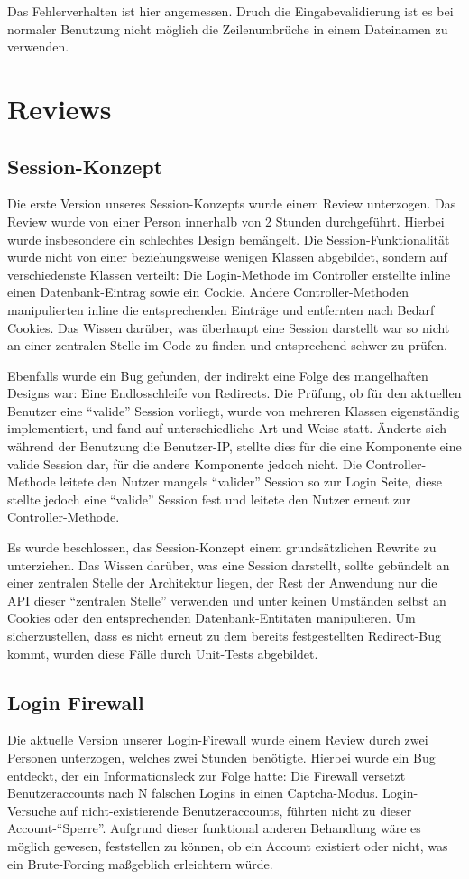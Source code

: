 \documentclass[12pt,DIV14,BCOR10mm,a4paper,parskip=half-,headsepline,headinclude,english,ngerman,bibliography=totocnumbered]{scrreprt}
\begin{document}
Das Fehlerverhalten ist hier angemessen. Druch die Eingabevalidierung ist es bei normaler Benutzung nicht möglich die Zeilenumbrüche in einem Dateinamen zu verwenden.

\section{Reviews}
\subsection{Session-Konzept}
Die erste Version unseres Session-Konzepts wurde einem Review unterzogen. Das Review wurde von einer Person innerhalb von 2 Stunden durchgeführt. Hierbei wurde insbesondere ein schlechtes Design bemängelt. Die Session-Funktionalität wurde nicht von einer beziehungsweise wenigen Klassen abgebildet, sondern auf verschiedenste Klassen verteilt: Die Login-Methode im Controller erstellte inline einen Datenbank-Eintrag sowie ein Cookie. Andere Controller-Methoden manipulierten inline die entsprechenden Einträge und entfernten nach Bedarf Cookies. Das Wissen darüber, was überhaupt eine Session darstellt war so nicht an einer zentralen Stelle im Code zu finden und entsprechend schwer zu prüfen.

Ebenfalls wurde ein Bug gefunden, der indirekt eine Folge des mangelhaften Designs war: Eine Endlosschleife von Redirects. Die Prüfung, ob für den aktuellen Benutzer eine \enquote{valide} Session vorliegt, wurde von mehreren Klassen eigenständig implementiert, und fand auf unterschiedliche Art und Weise statt. Änderte sich während der Benutzung die Benutzer-IP, stellte dies für die eine Komponente eine valide Session dar, für die andere Komponente jedoch nicht. Die Controller-Methode leitete den Nutzer mangels \enquote{valider} Session so zur Login Seite, diese stellte jedoch eine \enquote{valide} Session fest und leitete den Nutzer erneut zur Controller-Methode.

Es wurde beschlossen, das Session-Konzept einem grundsätzlichen Rewrite zu unterziehen. Das Wissen darüber, was eine Session darstellt, sollte gebündelt an einer zentralen Stelle der Architektur liegen, der Rest der Anwendung nur die API dieser \enquote{zentralen Stelle} verwenden und unter keinen Umständen selbst an Cookies oder den entsprechenden Datenbank-Entitäten manipulieren. Um sicherzustellen, dass es nicht erneut zu dem bereits festgestellten Redirect-Bug kommt, wurden diese Fälle durch Unit-Tests abgebildet.

\subsection{Login Firewall}
Die aktuelle Version unserer Login-Firewall wurde einem Review durch zwei Personen unterzogen, welches zwei Stunden benötigte. Hierbei wurde ein Bug entdeckt, der ein Informationsleck zur Folge hatte: Die Firewall versetzt Benutzeraccounts nach N falschen Logins in einen Captcha-Modus. Login-Versuche auf nicht-existierende Benutzeraccounts, führten nicht zu dieser Account-\enquote{Sperre}. Aufgrund dieser funktional anderen Behandlung wäre es möglich gewesen, feststellen zu können, ob ein Account existiert oder nicht, was ein Brute-Forcing maßgeblich erleichtern würde.
\end{document}
